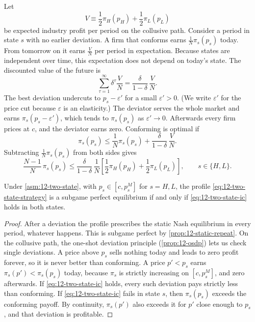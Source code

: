 Let
\begin{equation}\label{eq:12-two-state-V}
V \equiv \frac{1}{2}\pi_H(p_H) + \frac{1}{2}\pi_L(p_L)
\end{equation}
be expected industry profit per period on the collusive path. Consider a period in state $s$ with no earlier
deviation. A firm that conforms earns $\frac{1}{N}\pi_s(p_s)$ today. From tomorrow on it earns $\frac{V}{N}$ per period in
expectation. Because states are independent over time, this expectation does not depend on today's state. The
discounted value of the future is
\begin{equation*}
\sum_{\tau = 1}^{\infty} \delta^{\tau}\frac{V}{N} = \frac{\delta}{1-\delta}\,\frac{V}{N}.
\end{equation*}
The best deviation undercuts to $p_s - \varepsilon'$ for a small $\varepsilon' > 0$. (We write $\varepsilon'$ for the price
cut because $\varepsilon$ is an elasticity.) The deviator serves the whole market and earns $\pi_s(p_s - \varepsilon')$,
which tends to $\pi_s(p_s)$ as $\varepsilon' \to 0$. Afterwards every firm prices at $c$, and the deviator earns zero.
Conforming is optimal if
\begin{equation*}
\pi_s(p_s) \le \frac{1}{N}\pi_s(p_s) + \frac{\delta}{1-\delta}\,\frac{V}{N}.
\end{equation*}
Subtracting $\frac{1}{N}\pi_s(p_s)$ from both sides gives
\begin{equation}\label{eq:12-two-state-ic}
\frac{N-1}{N}\,\pi_s(p_s) \le \frac{\delta}{1-\delta}\,\frac{1}{N}\left[\frac{1}{2}\pi_H(p_H) + \frac{1}{2}\pi_L(p_L)\right],
\qquad s \in \{H, L\}.
\end{equation}

\begin{proposition}\label{prop:12-rs-two-state-ic}
Under \cref{asm:12-two-state}, with $p_s \in [c, p_s^M]$ for $s = H, L$, the profile \eqref{eq:12-two-state-strategy}
is a subgame perfect equilibrium if and only if \eqref{eq:12-two-state-ic} holds in both states.
\end{proposition}

\begin{proof}
After a deviation the profile prescribes the static Nash equilibrium in every period, whatever happens. This is
subgame perfect by \cref{prop:12-static-repeat}. On the collusive path, the one-shot deviation principle
(\cref{prop:12-osdp}) lets us check single deviations. A price above $p_s$ sells nothing today and leads to zero
profit forever, so it is never better than conforming. A price $p' < p_s$ earns $\pi_s(p') < \pi_s(p_s)$ today, because
$\pi_s$ is strictly increasing on $[c, p_s^M]$, and zero afterwards. If \eqref{eq:12-two-state-ic} holds, every such
deviation pays strictly less than conforming. If \eqref{eq:12-two-state-ic} fails in state $s$, then
$\pi_s(p_s)$ exceeds the conforming payoff. By continuity, $\pi_s(p')$ also exceeds it for $p'$ close enough to
$p_s$, and that deviation is profitable.
\end{proof}

